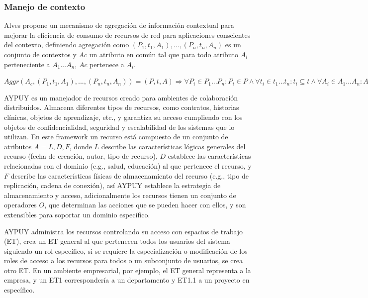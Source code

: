 \subsubsection {Manejo de contexto}

Alves \cite{alves2013radiator} propone un mecanismo de agregaci\'on de informaci\'on contextual para mejorar la eficiencia de consumo de recursos de red para aplicaciones conscientes del contexto, definiendo agregaci\'on como ${ ( P_{1},t_{1},A_{1} ),..., ( P_{n},t_{n},A_{n} ) }$ es un conjunto de contextos y $Ac$ un atributo en com\'un tal que para todo atributo $A_{i}$ perteneciente a $A_{1} ... A_{n}$, $Ac$ pertenece a $A_{i}$.

$Aggr( A_{c}, {( P_{1},t_{1},A_{1} ),..., ( P_{n},t_{n},A_{n} )}) = ( P, t, A )\Rightarrow \forall P_{i}\in P_{1}...P_{n}:P_{i}\in P \wedge \forall t_{i} \in t_{1}...t_{n}:t_{i}\subseteq t \wedge \forall A_{i}\in A_{1}...A_{n}:A_{i}\in A$

AYPUY es un manejador de recursos creado para ambientes de colaboraci\'on distribuidos.  Almacena diferentes tipos de recursos, como contratos, historias cl\'inicas, objetos de aprendizaje, etc., y garantiza su acceso cumpliendo con los objetos de confidencialidad, seguridad y escalabilidad de los sistemas que lo utilizan. En este framework un recurso est\'a compuesto de un conjunto de atributos $A = { L, D, F }$, donde $L$ describe las caracter\'isticas l\'ogicas generales del recurso (fecha de creaci\'on, autor, tipo de recurso), $D$ establece las caracter\'isticas relacionadas con el dominio (e.g., salud, educaci\'on) al que pertenece el recurso, y $F$ describe las caracter\'isticas f\'isicas de almacenamiento del recurso (e.g., tipo de replicaci\'on, cadena de conexi\'on), as\'i AYPUY establece la estrategia de almacenamiento y acceso, adicionalmente los recursos tienen un conjunto de operadores $O$, que determinan las acciones que se pueden hacer con ellos, y son extensibles para soportar un dominio espec\'ifico.

AYPUY administra los recursos controlando su acceso con espacios de trabajo (ET), crea un ET general al que pertenecen todos los usuarios del sistema siguiendo un rol espec\'ifico, si se requiere la especializaci\'on o modificaci\'on de los roles de acceso a los recursos para todos o un subconjunto de usuarios, se crea otro ET. En un ambiente empresarial, por ejemplo, el ET general representa a la empresa, y un ET1 corresponder\'ia a un departamento y ET1.1 a un proyecto en espec\'ifico.

